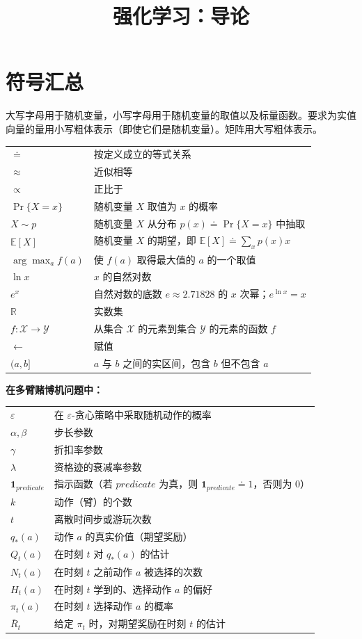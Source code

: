 \documentclass[UTF8, 12pt, fontset=fandol, oneside]{ctexart}
\title{强化学习：导论}
\author{}
\date{}
\begin{document}
\maketitle

\section*{符号汇总}

大写字母用于随机变量，小写字母用于随机变量的取值以及标量函数。要求为实值向量的量用小写粗体表示（即使它们是随机变量）。矩阵用大写粗体表示。

\begin{longtable}{p{}p{}}
$\doteq$ & 按定义成立的等式关系 \\
$\approx$ & 近似相等 \\
$\propto$ & 正比于 \\
$\Pr\{X=x\}$ & 随机变量 $X$ 取值为 $x$ 的概率 \\
$X\sim p$ & 随机变量 $X$ 从分布 $p(x)\doteq\Pr\{X=x\}$ 中抽取 \\
$\mathbb{E}[X]$ & 随机变量 $X$ 的期望，即 $\mathbb{E}[X]\doteq\sum_x p(x)x$ \\
$\arg\max_a f(a)$ & 使 $f(a)$ 取得最大值的 $a$ 的一个取值 \\
$\ln x$ & $x$ 的自然对数 \\
$e^x$ & 自然对数的底数 $e\approx2.71828$ 的 $x$ 次幂；$e^{\ln x}=x$ \\
$\mathbb{R}$ & 实数集 \\
$f:\mathcal{X}\to\mathcal{Y}$ & 从集合 $\mathcal{X}$ 的元素到集合 $\mathcal{Y}$ 的元素的函数 $f$ \\
$\leftarrow$ & 赋值 \\
$(a,b]$ & $a$ 与 $b$ 之间的实区间，包含 $b$ 但不包含 $a$ \\
\end{longtable}

\noindent\textbf{在多臂赌博机问题中：}
\begin{longtable}{p{}p{}}
$\varepsilon$ & 在 $\varepsilon$-贪心策略中采取随机动作的概率 \\
$\alpha,\beta$ & 步长参数 \\
$\gamma$ & 折扣率参数 \\
$\lambda$ & 资格迹的衰减率参数 \\
$\mathbf{1}_{predicate}$ & 指示函数（若 $predicate$ 为真，则 $\mathbf{1}_{predicate}\doteq1$，否则为 $0$） \\
$k$ & 动作（臂）的个数 \\
$t$ & 离散时间步或游玩次数 \\
$q_*(a)$ & 动作 $a$ 的真实价值（期望奖励） \\
$Q_t(a)$ & 在时刻 $t$ 对 $q_*(a)$ 的估计 \\
$N_t(a)$ & 在时刻 $t$ 之前动作 $a$ 被选择的次数 \\
$H_t(a)$ & 在时刻 $t$ 学到的、选择动作 $a$ 的偏好 \\
$\pi_t(a)$ & 在时刻 $t$ 选择动作 $a$ 的概率 \\
$\bar R_t$ & 给定 $\pi_t$ 时，对期望奖励在时刻 $t$ 的估计 \\
\end{longtable}
\end{document}
